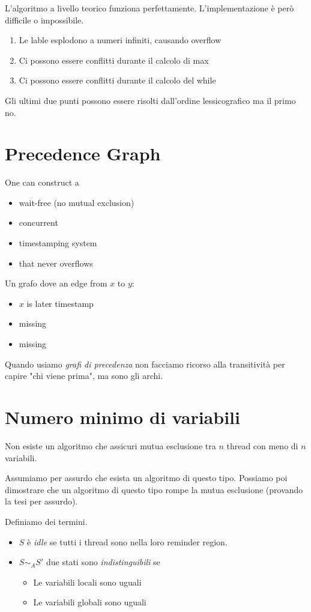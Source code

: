 \documentclass{article}
\begin{document}
L'algoritmo a livello teorico funziona perfettamente. L'implementazione è però difficile o impossibile.
\begin{enumerate}
    \item Le lable esplodono a numeri infiniti, causando overflow
    \item Ci possono essere conflitti durante il calcolo di max
    \item Ci possono essere conflitti durante il calcolo del while
\end{enumerate}
Gli ultimi due punti possono essere risolti dall'ordine lessicografico ma il primo no.

\section{Precedence Graph}
One can construct a 
\begin{itemize}
    \item wait-free (no mutual exclusion)
    \item concurrent
    \item timestamping system
    \item that never overflows
\end{itemize}
Un grafo dove an edge from $x$ to $y$: \begin{itemize}
    \item $x$ is later timestamp
    \item missing
    \item missing
\end{itemize}
Quando usiamo \textit{grafi di precedenza} non facciamo ricorso alla transitività per capire "chi viene prima", ma sono gli archi.

\section{Numero minimo di variabili}
Non esiste un algoritmo che assicuri mutua esclusione tra $n$ thread con meno di $n$ variabili.

Assumiamo per assurdo che esista un algoritmo di questo tipo. Possiamo poi dimostrare che un algoritmo di questo tipo rompe la mutua esclusione (provando la tesi per assurdo).

Definiamo dei termini.
\begin{itemize}
    \item $S$ è \textit{idle} se tutti i thread sono nella loro reminder region.
    \item $S\sim_A S'$ due stati sono \textit{indistinguibili} se
        \begin{itemize}
            \item Le variabili locali sono uguali
            \item Le variabili globali sono uguali
        \end{itemize}
\end{itemize}
\end{document}
